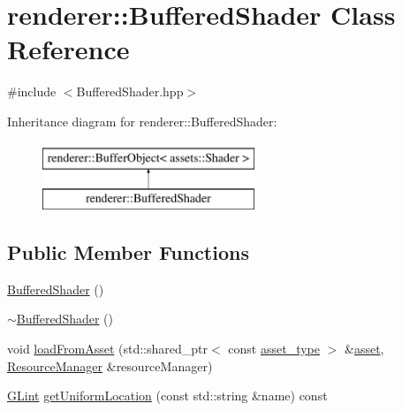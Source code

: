 \hypertarget{classrenderer_1_1BufferedShader}{\section{renderer\-:\-:Buffered\-Shader Class Reference}
\label{classrenderer_1_1BufferedShader}
}


{\ttfamily \#include $<$Buffered\-Shader.\-hpp$>$}

Inheritance diagram for renderer\-:\-:Buffered\-Shader\-:\begin{figure}[H]
\begin{center}
\leavevmode
\includegraphics[height=2.000000cm]{classrenderer_1_1BufferedShader}
\end{center}
\end{figure}
\subsection*{Public Member Functions}
\begin{DoxyCompactItemize}
\item 
\hyperlink{classrenderer_1_1BufferedShader_acdc7235a2481ed1f84848ad747fb5dec}{Buffered\-Shader} ()
\item 
\hyperlink{classrenderer_1_1BufferedShader_ae34c244fe7f6fa291a98afc65e9bb306}{$\sim$\-Buffered\-Shader} ()
\item 
void \hyperlink{classrenderer_1_1BufferedShader_ab853033ff4e5d4c9cce95b7703d1017b}{load\-From\-Asset} (std\-::shared\-\_\-ptr$<$ const \hyperlink{classrenderer_1_1BufferObject_a651cbaff8aa7148d72a9eaf71ad3636e}{asset\-\_\-type} $>$ \&\hyperlink{classrenderer_1_1BufferObject_ad747c7e09a4acda6847b6fca9977eed6}{asset}, \hyperlink{classrenderer_1_1ResourceManager}{Resource\-Manager} \&resource\-Manager)
\item 
\hyperlink{Shader_8hpp_a5ac0f3c4d7fafd42b284b5487a791017}{G\-Lint} \hyperlink{classrenderer_1_1BufferedShader_a3d1f11e57c42899c380442370a0d3f3b}{get\-Uniform\-Location} (const std\-::string \&name) const 
\end{DoxyCompactItemize}
